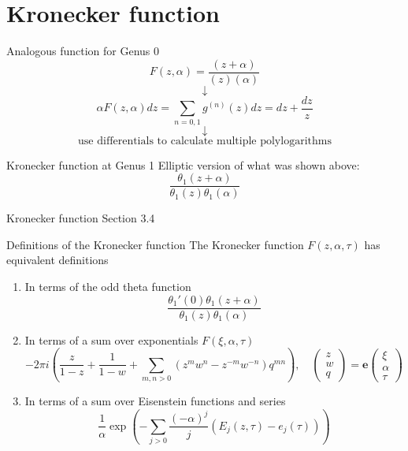 \documentclass[11pt,aspectratio=169]{beamer}
\newcommand{\ee}[0]{\mathbf{e}}
\begin{document}
\section{Kronecker function}

\begin{frame}{Analogous function for Genus 0}
    \[F(z,\alpha) = \frac{(z+\alpha)}{(z)(\alpha)}\]
    \[\downarrow\]
    \[\alpha F(z,\alpha) dz = \sum_{n=0,1} g^{(n)}(z) dz = dz + \frac{dz}{z}\]
    \[\downarrow\]
    \[\text{use differentials to calculate multiple polylogarithms}\]

    \begin{block}{Kronecker function at Genus 1}
        Elliptic version of what was shown above:
        \[\frac{\theta_1(z+\alpha)}{\theta_1(z)\theta_1(\alpha)}\]
    \end{block}
\end{frame}

\begin{frame}{Kronecker function}{\tiny \cite{BL13} Section 3.4}
    \begin{block}{Definitions of the Kronecker function}
        The Kronecker function $F(z,\alpha,\tau)$ has equivalent definitions
        \begin{enumerate}
            \item In terms of the odd theta function
            \[\frac{\theta_1'(0)\theta_1(z+\alpha)}{\theta_1(z)\theta_1(\alpha)}\]
            \item In terms of a sum over exponentials $F(\xi,\alpha,\tau)$
            \[-2\pi i \left(\frac{z}{1-z} + \frac{1}{1-w} + \sum_{m,n > 0} (z^m w^n - z^{-m} w^{-n}) q^{mn}\right) , \quad \begin{pmatrix} z \\ w \\ q \end{pmatrix} = \ee \begin{pmatrix}\xi \\ \alpha \\ \tau\end{pmatrix}\]
            \item In terms of a sum over Eisenstein functions and series
            \[\frac{1}{\alpha} \exp\left(-\sum_{j > 0} \frac{(-\alpha)^j}{j} (E_j(z,\tau) - e_j(\tau))\right)\]
        \end{enumerate}
    \end{block}
\end{frame}
\end{document}
